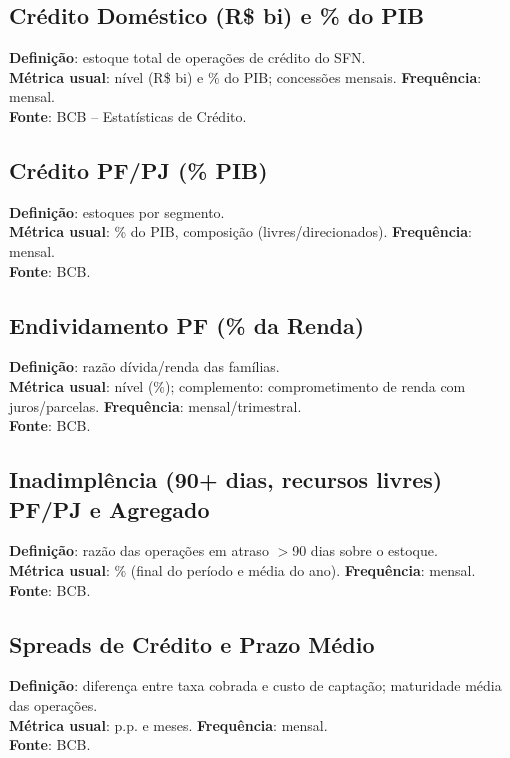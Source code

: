 \documentclass[11pt,a4paper]{article}
\begin{document}
\subsection*{Crédito Doméstico (R\$ bi) e \% do PIB}
\textbf{Definição}: estoque total de operações de crédito do SFN.\\
\textbf{Métrica usual}: nível (R\$ bi) e \% do PIB; concessões mensais. \textbf{Frequência}: mensal.\\
\textbf{Fonte}: BCB -- Estatísticas de Crédito.

\subsection*{Crédito PF/PJ (\% PIB)}
\textbf{Definição}: estoques por segmento.\\
\textbf{Métrica usual}: \% do PIB, composição (livres/direcionados). \textbf{Frequência}: mensal.\\
\textbf{Fonte}: BCB.

\subsection*{Endividamento PF (\% da Renda)}
\textbf{Definição}: razão dívida/renda das famílias.\\
\textbf{Métrica usual}: nível (\%); complemento: comprometimento de renda com juros/parcelas. \textbf{Frequência}: mensal/trimestral.\\
\textbf{Fonte}: BCB.

\subsection*{Inadimplência (90+ dias, recursos livres) PF/PJ e Agregado}
\textbf{Definição}: razão das operações em atraso $>$90 dias sobre o estoque.\\
\textbf{Métrica usual}: \% (final do período e média do ano). \textbf{Frequência}: mensal.\\
\textbf{Fonte}: BCB.

\subsection*{Spreads de Crédito e Prazo Médio}
\textbf{Definição}: diferença entre taxa cobrada e custo de captação; maturidade média das operações.\\
\textbf{Métrica usual}: p.p. e meses. \textbf{Frequência}: mensal.\\
\textbf{Fonte}: BCB.
\end{document}
